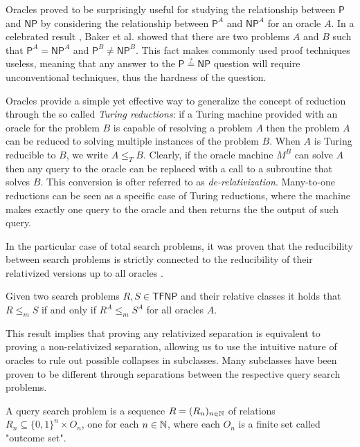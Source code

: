 Oracles proved to be surprisingly useful for studying the relationship between $\mathsf{P}$ and $\mathsf{NP}$ by considering the relationship between $\mathsf{P}^A$ and $\mathsf{NP}^A$ for an oracle $A$. In a celebrated result \cite{relativization_p_np}, Baker et al. showed that there are two problems $A$ and $B$ such that $\mathsf{P}^A = \mathsf{NP}^A$ and $\mathsf{P}^B \neq \mathsf{NP}^B$. This fact makes commonly used proof techniques useless, meaning that any answer to the $\mathsf{P} \stackrel{?}{=} \mathsf{NP}$ question will require unconventional techniques, thus the hardness of the question.

Oracles provide a simple yet effective way to generalize the concept of reduction through the so called \textit{Turing reductions}: if a Turing machine provided with an oracle for the problem $B$ is capable of resolving a problem $A$ then the problem $A$ can be reduced to solving multiple instances of the problem $B$. When $A$ is Turing reducible to $B$, we write $A \leq_T B$. Clearly, if the oracle machine $M^B$ can solve $A$ then any query to the oracle can be replaced with a call to a subroutine that solves $B$. This conversion is ofter referred to as \textit{de-relativization}. Many-to-one reductions can be seen as a specific case of Turing reductions, where the machine makes exactly one query to the oracle and then returns the the output of such query.

In the particular case of total search problems, it was proven that the reducibility between search problems is strictly connected to the reducibility of their relativized versions up to all oracles \cite{rel_comp_np_search}.

\begin{theorem}
    Given two search problems $R,S \in \mathsf{TFNP}$ and their relative classes it holds that $R \leq_m S$ if and only if $R^A \leq_m S^A$ for all oracles $A$.
\end{theorem}

This result implies that proving any relativized separation is equivalent to proving a non-relativized separation, allowing us to use the intuitive nature of oracles to rule out possible collapses in \TFNP subclasses. Many \TFNP subclasses have been proven to be different through separations between the respective query search problems. \cite{proofs_circuits_communication, tfnp_characterization}

\begin{definition}
    A query search problem is a sequence $R = (R_n)_{n \in \mathbb{N}}$ of relations $R_n \subseteq \{0,1\}^n \times O_n$, one for each $n \in \mathbb{N}$, where each $O_n$ is a finite set called "outcome set".
\end{definition}

